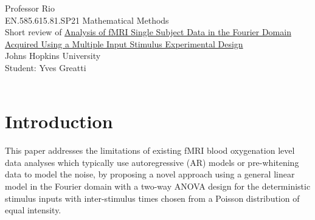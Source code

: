 \documentclass[12pt,twoside]{article}
\begin{document}
\noindent Professor Rio\\
EN.585.615.81.SP21 Mathematical Methods\\
Short review of \href{https://blackboard.jhu.edu/courses/1/EN.585.615.81.SP21/db/_11111758_1/JSIP20120400006_16101005.pdf}{Analysis of fMRI Single Subject Data in the Fourier Domain Acquired Using a Multiple Input Stimulus Experimental Design} \\
Johns Hopkins University\\
Student: Yves Greatti\\\

\section*{Introduction}
This paper addresses the limitations of existing fMRI blood oxygenation level data analyses which typically use autoregressive (AR) models 
or pre-whitening data to model the noise, by proposing a novel approach using a general linear model in the Fourier domain
with a two-way ANOVA design for the deterministic stimulus inputs with inter-stimulus times chosen from a Poisson distribution of equal intensity.
\end{document}
